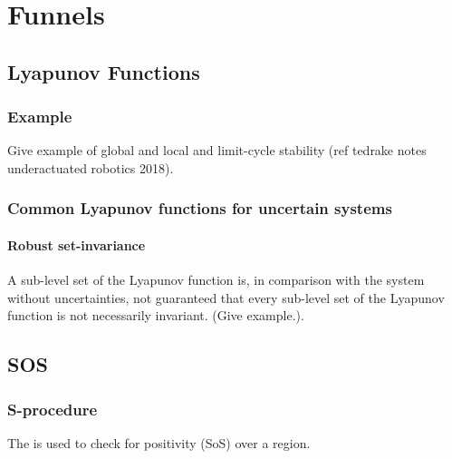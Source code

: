 \chapter{Funnels}


\section{}

\section{Lyapunov Functions}

\subsection{Example}
Give example of global and local and limit-cycle stability (ref tedrake notes
underactuated robotics 2018).

\subsection{Common Lyapunov functions for uncertain systems}
\subsubsection{Robust set-invariance}

A sub-level set of the Lyapunov function is, in comparison with the system
without uncertainties, not guaranteed that every sub-level set of the Lyapunov
function is not necessarily invariant. (Give example.).

\section{SOS}

\subsection{S-procedure}

The  is used to check for positivity (SoS) over a region.